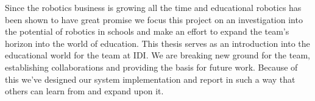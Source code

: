 
\bigskip\noindent
Since the robotics business is growing all the time and educational robotics has been shown to have great promise we focus this project on an investigation into the potential of robotics in schools and make an effort to expand the \chirp team's horizon into the world of education. This thesis serves as an introduction into the educational world for the \chirp team at IDI. We are breaking new ground for the team, establishing collaborations and providing the basis for future work. 
Because of this we've designed our system implementation and report in such a way that others can learn from and expand upon it. 